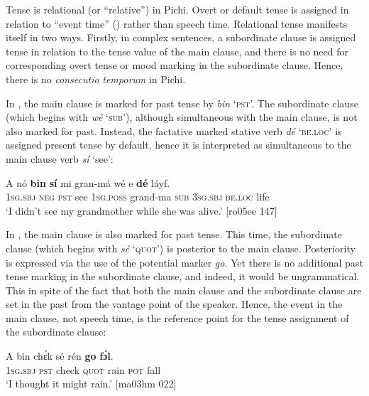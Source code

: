 Tense is relational (or “relative”) in Pichi. Overt or default tense is assigned in relation to “event time” (\citealt{ChungTimberlake1985}) rather than speech time. Relational tense manifests itself in two ways. Firstly, in complex sentences, a subordinate clause is assigned tense in relation to the tense value of the main clause, and there is no need for corresponding overt tense or mood marking in the subordinate clause. Hence, there is no \textit{consecutio} \textit{temporum} in Pichi.


In , the main clause is marked for past tense by \textit{bin} ‘\textsc{pst}’. The subordinate clause (which begins with \textit{wé} ‘\textsc{sub}’), although simultaneous with the main clause, is not also marked for past. Instead, the factative marked stative verb \textit{dé} \textsc{‘be.loc’} is assigned present tense by default, hence it is interpreted as simultaneous to the main clause verb \textit{sí} ‘see’: 



\ea%
    \label{ex:key:374}
    \gll \MakeUppercase{A}   nó  \textbf{bin}  \textbf{sí}  mi    gran-má    wé  e  \textbf{  dé} láyf.\\
\textsc{1sg.sbj}  \textsc{neg}  \textsc{pst}  see  \textsc{1sg.poss}  grand-ma  \textsc{sub}  \textsc{3sg.sbj}  \textsc{be.loc}  life\\

\glt ‘I didn’t see my grandmother while she was alive.’ [ro05ee 147]
\z

In , the main clause is also marked for past tense. This time, the subordinate clause (which begins with \textit{sé} ‘\textsc{quot}’) is posterior to the main clause. Posteriority is expressed via the use of the potential marker \textit{go}. Yet there is no additional past tense marking in the subordinate clause, and indeed, it would be ungrammatical. This in spite of the fact that both the main clause and the subordinate clause are set in the past from the vantage point of the speaker. Hence, the event in the main clause, not speech time, is the reference point for the tense assignment of the subordinate clause:


\ea%
    \label{ex:key:375}
    \gll A    bin  chɛ́k  sé    rén  \textbf{go}  \textbf{fɔ́l}.\\
\textsc{1sg.sbj}  \textsc{pst}  check  \textsc{quot}    rain  \textsc{pot}  fall\\

\glt ‘I thought it might rain.’ [ma03hm 022]
\z

